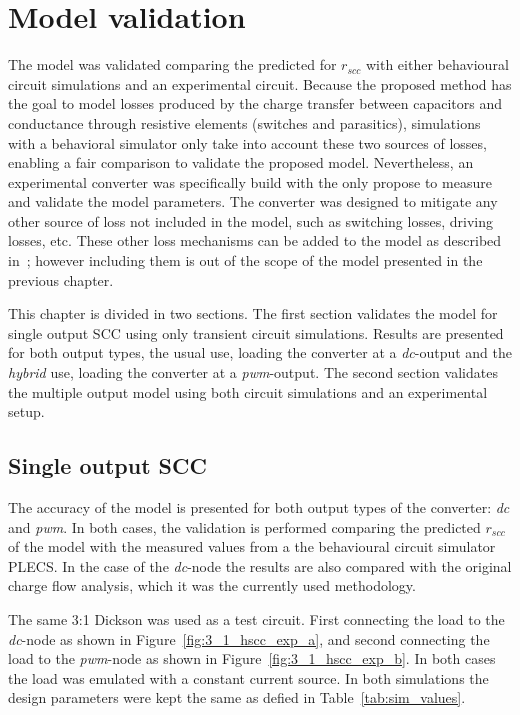 \chapter{Model validation}
The model was validated comparing the predicted for $r_{scc}$ with either behavioural circuit simulations and an experimental circuit.  Because the proposed method has the goal to model losses produced by the charge transfer between capacitors and conductance through resistive elements (switches and parasitics), simulations with a behavioral simulator only take into account these two sources of losses, enabling a fair comparison to validate the proposed model.  Nevertheless, an experimental converter was specifically build with the only propose to measure and validate the model parameters. The converter was designed to mitigate any other source of loss not included in the model, such as switching losses, driving losses, etc. These other loss mechanisms can be added to the model as described in~\cite{Seeman:EECS-2009-78}; however including them is out of the scope of the model presented in the previous chapter.

This chapter is divided in two sections. The first section validates the model for single output SCC using only transient circuit simulations. Results are presented for both output types, the usual use, loading the converter at a \emph{dc}-output and the \emph{hybrid} use, loading the converter at a \emph{pwm}-output.  The second section validates the multiple output model using both circuit simulations and an experimental setup.

\section{Single output SCC}
The accuracy of the model is presented for both output types of the converter:
\emph{dc} and \emph{pwm}. In both cases, the validation is performed comparing the predicted $r_{scc}$ of the model with the measured values from a the behavioural circuit simulator PLECS. In the case of the \emph{dc}-node the results are also compared with the original charge flow analysis, which it was the currently used methodology.

The same 3:1 Dickson was used as a test circuit. First connecting the load to the \emph{dc}-node as shown in Figure~\ref{fig:3_1_hscc_exp_a}, and second connecting the load to the \emph{pwm}-node as shown in Figure~\ref{fig:3_1_hscc_exp_b}. In both cases the load was emulated with a constant current source. In both simulations the design parameters were kept the same as defied in Table~\ref{tab:sim_values}.

